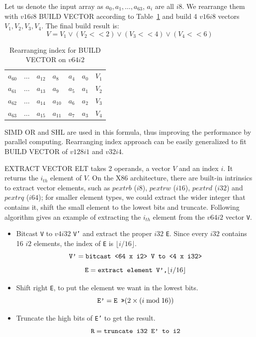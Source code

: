 Let us denote the input array as $a_0, a_1, \ldots, a_{63}$, $a_i$ are all $i8$. We rearrange them with $v16i8$ BUILD VECTOR according to Table~\ref{table:build_vector} and build 4 $v16i8$ vectors $V_1, V_2, V_3, V_4$. The final build result is:
\begin{equation}
  V = V_1 \lor (V_2 << 2) \lor (V_3 << 4) \lor (V_4 << 6)
\end{equation}

\begin{table}[h]
\centering
\begin{tabular}{|p{1cm}|p{1cm}|p{1cm}|p{1cm}|p{1cm}|p{1cm}|r}
\cline{1-6}
$a_{60}$ & $\ldots$ & $a_{12}$ & $a_8$ & $a_4$ & $a_0$ & $V_1$ \\ \cline{1-6}
$a_{61}$ & $\ldots$ & $a_{13}$ & $a_9$ & $a_5$ & $a_1$ & $V_2$ \\ \cline{1-6}
$a_{62}$ & $\ldots$ & $a_{14}$ & $a_{10}$ & $a_6$ & $a_2$ & $V_3$ \\ \cline{1-6}
$a_{63}$ & $\ldots$ & $a_{15}$ & $a_{11}$ & $a_7$ & $a_3$ & $V_4$ \\ \cline{1-6}
\end{tabular}
\caption{Rearranging index for BUILD VECTOR on $v64i2$}
\label{table:build_vector}
\end{table}

SIMD OR and SHL are used in this formula, thus improving the performance by parallel computing. Rearranging index approach can be easily generalized to fit BUILD VECTOR of $v128i1$ and $v32i4$.

EXTRACT VECTOR ELT takes 2 operands, a vector $V$ and an index $i$. It returns the $i_{th}$ element of $V$. On the X86 architecture, there are built-in intrinsics to extract vector elements, such as $pextrb$ ($i8$), $pextrw$ ($i16$), $pextrd$ ($i32$) and $pextrq$ ($i64$); for smaller element types, we could extract the wider integer that contains it, shift the small element to the lowest bits and truncate. Following algorithm gives an example of extracting the $i_{th}$ element from the $v64i2$ vector {\tt V}.

\begin{itemize}
  \item Bitcast {\tt V} to $v4i32$ {\tt V'} and extract the proper $i32$ {\tt E}. Since every $i32$ contains 16 $i2$ elements, the index of {\tt E} is $\lfloor i / 16 \rfloor$.
  \[\text{\tt V'} = \text{\tt bitcast <64 x i2> V to <4 x i32>} \]
  \[\text{\tt E} = \text{\tt extract element V',} \lfloor i / 16 \rfloor \]
  \item Shift right {\tt E}, to put the element we want in the lowest bits.
  \[\text{\tt E'} = \text{\tt E >>} (2 \times (i \bmod 16))\]
  \item Truncate the high bits of {\tt E'} to get the result.
  \[\text{\tt R} = \text{\tt truncate i32 E' to i2}\]
\end{itemize}

